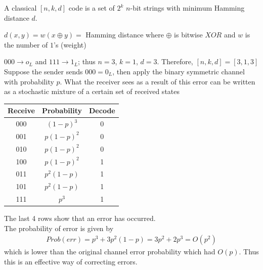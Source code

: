 \begin{definition}
    A classical $[n,k,d]$ code is a set of $2^k$ $n$-bit strings with minimum Hamming distance $d$. 
\end{definition}

\begin{definition}
    $d(x,y) = w(x \oplus y ) = $ Hamming distance where $\oplus$ is bitwise $XOR$ and $w$ is the number of $1$'s (weight)
\end{definition}

\begin{example}
    $000 \rightarrow o_L$ and $111 \rightarrow 1_L$; thus $n=3$, $k=1$, $d=3$. Therefore, $[n,k,d] = [3,1,3]$ \\

    Suppose the sender sends $000 = 0_L$, then apply the binary symmetric channel with probability $p$. What the receiver sees as a result of this error can be written as a stochastic mixture of a certain set of received states
    
    \begin{center}
    \begin{tabular}{ c | c | c }
    Receive & Probability & Decode\\
    \hline
    000 & $(1-p)^3$ & 0 \\
    001 & $p(1-p)^2$ & 0 \\
    010 & $p(1-p)^2$ & 0 \\
    100 & $p(1-p)^2$ & 1 \\
    011 & $p^2(1-p)$ & 1 \\
    101 & $p^2(1-p)$ & 1 \\
    111 & $p^3$ & 1 \\
    \end{tabular}
    \end{center}
    The last 4 rows show that an error has occurred.\\
    The probability of error is given by
    \begin{align}
        Prob(err) = p^3 + 3p^2(1-p) = 3p^2 + 2p^3 = O(p^2)
    \end{align}
    which is lower than the original channel error probability which had $O(p)$. Thus this is an effective way of correcting errors. 
\end{example}


